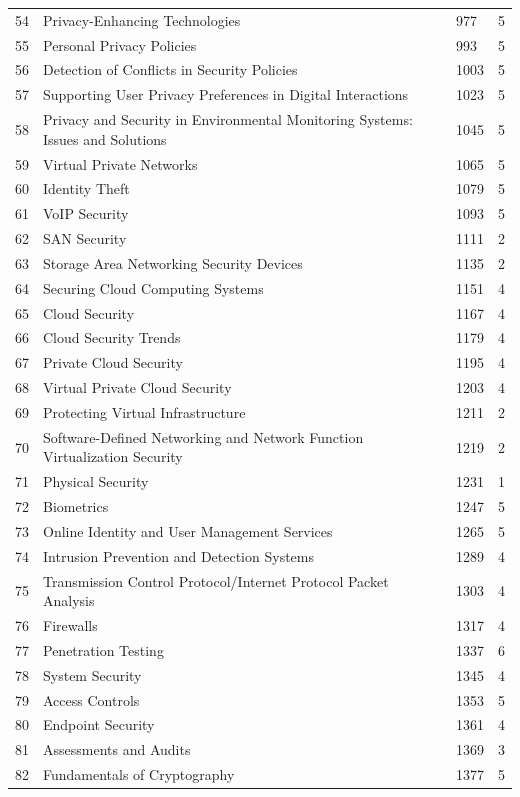 \documentclass[10pt,letterpaper,oneside]{article}
\begin{document}
\begin{longtable}{@{}p{}p{}p{}p{}@{}}
54 & Privacy-Enhancing Technologies & 977 & 5 \\
55 & Personal Privacy Policies & 993 & 5 \\
56 & Detection of Conflicts in Security Policies & 1003 & 5 \\
57 & Supporting User Privacy Preferences in Digital Interactions & 1023 & 5 \\
58 & Privacy and Security in Environmental Monitoring Systems: Issues and Solutions & 1045 & 5 \\
59 & Virtual Private Networks & 1065 & 5 \\
60 & Identity Theft & 1079 & 5 \\
61 & VoIP Security & 1093 & 5 \\
62 & SAN Security & 1111 & 2 \\
63 & Storage Area Networking Security Devices & 1135 & 2 \\
64 & Securing Cloud Computing Systems & 1151 & 4 \\
65 & Cloud Security & 1167 & 4 \\
66 & Cloud Security Trends & 1179 & 4 \\
67 & Private Cloud Security & 1195 & 4 \\
68 & Virtual Private Cloud Security & 1203 & 4 \\
69 & Protecting Virtual Infrastructure & 1211 & 2 \\
70 & Software-Defined Networking and Network Function Virtualization Security & 1219 & 2 \\
71 & Physical Security & 1231 & 1 \\
72 & Biometrics & 1247 & 5 \\
73 & Online Identity and User Management Services & 1265 & 5 \\
74 & Intrusion Prevention and Detection Systems & 1289 & 4 \\
75 & Transmission Control Protocol/Internet Protocol Packet Analysis & 1303 & 4 \\
76 & Firewalls & 1317 & 4 \\
77 & Penetration Testing & 1337 & 6 \\
78 & System Security & 1345 & 4 \\
79 & Access Controls & 1353 & 5 \\
80 & Endpoint Security & 1361 & 4 \\
81 & Assessments and Audits & 1369 & 3 \\
82 & Fundamentals of Cryptography & 1377 & 5 \\

\end{longtable}
\end{document}
